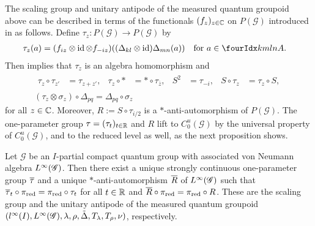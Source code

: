 The scaling group and unitary antipode of the measured quantum
groupoid above can be described in terms of the functionals
$(f_{z})_{z\in \mathbb{C}}$ on $P(\mathscr{G})$ introduced in \cite[Theorem
2.25]{DCT1} as follows.  Define $\tau_{z} \colon P(\mathscr{G}) \to
P(\mathscr{G})$ by
\begin{align*}
\tau_{z}(a) &= (f_{iz} \otimes \id \otimes f_{-iz})((\Delta_{kl}
\otimes \id)\Delta_{mn}(a)) \quad \text{for } a\in \Gr{A}{k}{l}{m}{n}.
\end{align*}
Then \cite[Theorem 2.25]{DCT1} implies that $\tau_{z}$ is an algebra
homomorphism and
\begin{gather} \label{eq:alg-scale}
  \begin{aligned}
    \tau_{z} \circ \tau_{z'} &= \tau_{z+z'}, & \tau_{z}\circ \ast &=
    \ast\circ \tau_{\overline{z}}, & S^{2} &= \tau_{-i}, & S \circ
    \tau_{z} &= \tau_{z} \circ S,
  \end{aligned}
 \\  \label{eq:alg-mod-aut-delta} (\tau_{z} \otimes \sigma_{z})
    \circ \Delta_{pq} = \Delta_{pq} \circ \sigma_{z}
  \end{gather}
for all $z\in \mathbb{C}$. Moreover, $R:=S\circ
\tau_{i/2}$ is a $*$-anti-automorphism of $P(\mathscr{G})$.  The
one-parameter group $\tau=(\tau_{t})_{t\in \mathbb{R}}$ and $R$ lift to
$C^{u}_{0}(\mathscr{G})$ by the universal property of
$C^{u}_{0}(\mathscr{G})$, and to the reduced level as well, as the next proposition shows.
\begin{Prop}
  Let $\mathscr{G}$ be an $I$-partial compact quantum group with
  associated von Neumann algebra $L^{\infty}(\mathscr{G})$. Then there exist
a unique strongly continuous one-parameter group $\overline{\tau}$ and
 a unique $*$-anti-automorphism $\overline{R}$ of $L^{\infty}(\mathscr{G})$ such that
 $\overline{\tau}_{t} \circ \pi_{\operatorname{\mathrm{red}}} = \pi_{\operatorname{\mathrm{red}}} \circ
\tau_{t}$ for  all $t\in \mathbb{R}$ and
$\overline{R} \circ \pi_{\operatorname{\mathrm{red}}} = \pi_{\operatorname{\mathrm{red}}} \circ R$.
 These are the scaling group and the unitary antipode of the measured
 quantum groupoid $(l^{\infty}(I),L^{\infty}(\mathscr{G}), \lambda,\rho,\tilde\Delta,
 T_{\lambda},T_{\rho},\nu)$, respectively.
\end{Prop}
